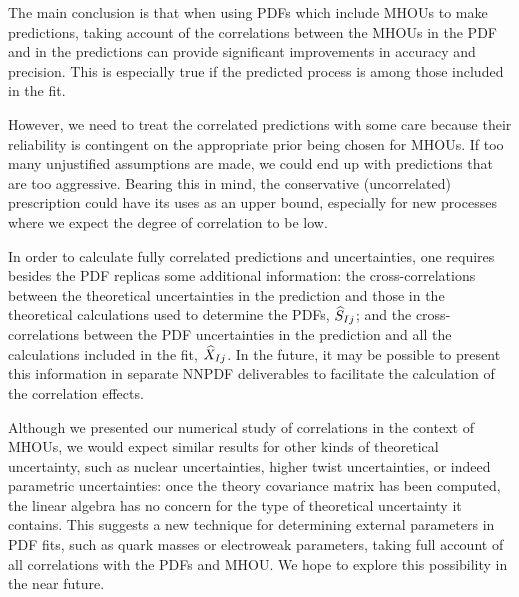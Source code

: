 The main conclusion is that when using PDFs which include MHOUs to make predictions, taking account of the correlations between the MHOUs in the PDF and in the predictions can provide significant improvements in accuracy and precision. This is especially true if the predicted process is among those included in the fit. 

However, we need to treat the correlated predictions with some care because their reliability is contingent on the appropriate prior being chosen for MHOUs. If too many unjustified assumptions are made, we could end up with predictions that are too aggressive. Bearing this in mind, the conservative (uncorrelated) prescription could have its uses as an upper bound, especially for new processes where we expect the degree of correlation to be low.

In order to calculate fully correlated predictions and uncertainties, one requires besides the PDF replicas some additional  information: the cross-correlations between the theoretical uncertainties in the prediction and those in the theoretical calculations used to determine the PDFs,  $\widehat{S}_{Ij}$; and the cross-correlations between the PDF uncertainties in the prediction and all the calculations included in the fit, $\widehat{X}_{Ij}$.  In the future, it may be possible to present this information in separate NNPDF deliverables to facilitate the calculation of the correlation effects.

Although we presented our numerical study of correlations in the context of MHOUs, we would expect similar results for other kinds of theoretical uncertainty, such as nuclear uncertainties, higher twist uncertainties, or indeed parametric uncertainties: once the theory covariance matrix has been computed, the linear algebra has no concern for the type of theoretical uncertainty it contains. This suggests a new technique for determining external parameters in PDF fits, such as quark masses or electroweak parameters, taking full account of all correlations with the PDFs and MHOU. We hope to explore this possibility in the near future.
